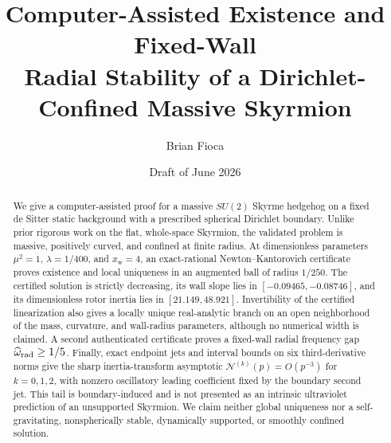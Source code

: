 \documentclass[11pt]{article}
\title{Computer-Assisted Existence and Fixed-Wall\\
Radial Stability of a Dirichlet-Confined Massive Skyrmion}
\author{Brian Fioca}
\date{Draft of June 2026}
\theoremstyle{definition}
\theoremstyle{remark}
\begin{document}
\maketitle

\begin{abstract}
We give a computer-assisted proof for a massive
$SU(2)$ Skyrme hedgehog on a fixed de Sitter static background with a prescribed
spherical Dirichlet boundary.  Unlike prior rigorous work on the flat,
whole-space Skyrmion, the validated problem is massive, positively curved, and
confined at finite radius.  At dimensionless parameters
$\mu^2=1$, $\lambda=1/400$, and $x_{\mathrm w}=4$, an exact-rational
Newton--Kantorovich certificate proves existence and local uniqueness in an
augmented ball of radius $1/250$.  The certified solution is strictly
decreasing, its wall slope lies in
$[-0.09465,-0.08746]$, and its dimensionless rotor inertia lies in
$[21.149,48.921]$.  Invertibility of the certified linearization also gives a
locally unique real-analytic branch on an open neighborhood of the mass,
curvature, and wall-radius parameters, although no numerical width is claimed.
A second authenticated certificate proves a fixed-wall
radial frequency gap $\widehat\omega_{\rm rad}\geq1/5$.  Finally, exact
endpoint jets and interval bounds on six third-derivative norms give the sharp
inertia-transform asymptotic $\mathcal N^{(k)}(p)=O(p^{-3})$ for
$k=0,1,2$, with nonzero oscillatory leading coefficient fixed by the boundary
second jet.  This tail is boundary-induced and is not presented as an intrinsic
ultraviolet prediction of an unsupported Skyrmion.  We claim neither global
uniqueness nor a self-gravitating, nonspherically stable, dynamically supported,
or smoothly confined solution.
\end{abstract}








\begingroup
\small
\let\originalthebibliography\thebibliography
\renewcommand{\thebibliography}[1]{%
  \originalthebibliography{#1}%
  \setlength{\itemsep}{0pt}%
  \setlength{\parskip}{0pt}%
}


\endgroup
\end{document}
